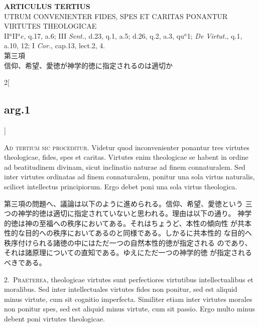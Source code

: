 \documentclass[paper=a4paper,fontsize=10pt,jafontsize=9pt,titlepage]{jlreq}
\begin{document}
{}
\setcounter{section}{3}
\setcounter{subsection}{0}
\begin{center}
{\Large {\bfseries ARTICULUS TERTIUS}}\\
{\large UTRUM CONVENIENTER FIDES, SPES ET CARITAS PONANTUR VIRTUTES THEOLOGICAE}\\
{\footnotesize II${^a}$II${^ae}$, q.17, a.6; III {\itshape Sent.}, d.23, q.1, a.5; d.26, q.2, a.3, qu$^{a}$1; {\itshape De Virtut.}, q.1, a.10, 12; I {\itshape Cor.}, cap.13, lect.2, 4.}\\
{\Large 第三項\\信仰、希望、愛徳が神学的徳に指定されるのは適切か}
\end{center}

\begin{paracol}{2}[\subsection{arg.1}]

{\scshape Ad tertium sic proceditur}. Videtur quod inconvenienter
ponantur tres virtutes theologicae, fides, spes et caritas. Virtutes
enim theologicae se habent in ordine ad beatitudinem divinam, sicut
inclinatio naturae ad finem connaturalem. Sed inter virtutes ordinatas
ad finem connaturalem, ponitur una sola virtus naturalis, scilicet
intellectus principiorum. Ergo debet poni una sola virtus theologica.

\switchcolumn

第三項の問題へ、議論は以下のように進められる。信仰、希望、愛徳という
 三つの神学的徳は適切に指定されていないと思われる。理由は以下の通り。
 神学的徳は神の至福への秩序においてある。それはちょうど、本性の傾向性
 が共本性的な目的への秩序においてあるのと同様である。しかるに共本性的
 な目的へ秩序付けられる諸徳の中にはただ一つの自然本性的徳が指定される
 のであり、それは諸原理についての直知である。ゆえにただ一つの神学的徳
 が指定されるべきである。


2.~{\scshape Praeterea}, theologicae virtutes sunt perfectiores
virtutibus intellectualibus et moralibus. Sed inter intellectuales
virtutes fides non ponitur, sed est aliquid minus virtute, cum sit
cognitio imperfecta. Similiter etiam inter virtutes morales non
ponitur spes, sed est aliquid minus virtute, cum sit passio. Ergo
multo minus debent poni virtutes theologicae.


\end{paracol}
\end{document}
